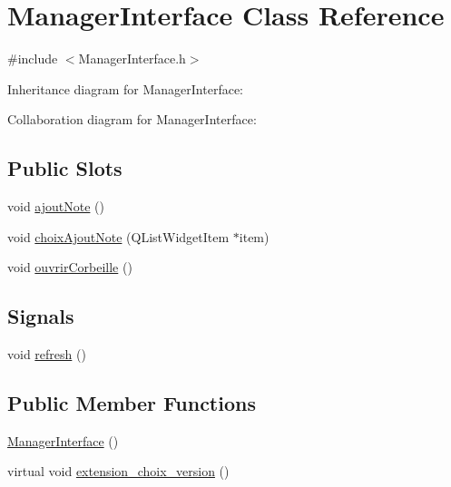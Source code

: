 \hypertarget{classManagerInterface}{}\section{Manager\+Interface Class Reference}
\label{classManagerInterface}


{\ttfamily \#include $<$Manager\+Interface.\+h$>$}



Inheritance diagram for Manager\+Interface\+:


Collaboration diagram for Manager\+Interface\+:
\subsection*{Public Slots}
\begin{DoxyCompactItemize}
\item 
void \hyperlink{classManagerInterface_a19f588faac5f191e4e02da31e56c944d}{ajout\+Note} ()
\item 
void \hyperlink{classManagerInterface_a639a6a8cea7321b53bf763b02b13ebb5}{choix\+Ajout\+Note} (Q\+List\+Widget\+Item $\ast$item)
\item 
void \hyperlink{classManagerInterface_a2bfe46c88ac2c8c1a4597f478afe9a9f}{ouvrir\+Corbeille} ()
\end{DoxyCompactItemize}
\subsection*{Signals}
\begin{DoxyCompactItemize}
\item 
void \hyperlink{classManagerInterface_ab43ba07ee3509089770d4066177bb38a}{refresh} ()
\end{DoxyCompactItemize}
\subsection*{Public Member Functions}
\begin{DoxyCompactItemize}
\item 
\hyperlink{classManagerInterface_a9c0561998e278c6f55dc9e1501786f73}{Manager\+Interface} ()
\item 
virtual void \hyperlink{classManagerInterface_ae4ca071d615d0c85bb462e03284931e6}{extension\+\_\+choix\+\_\+version} ()
\end{DoxyCompactItemize}
